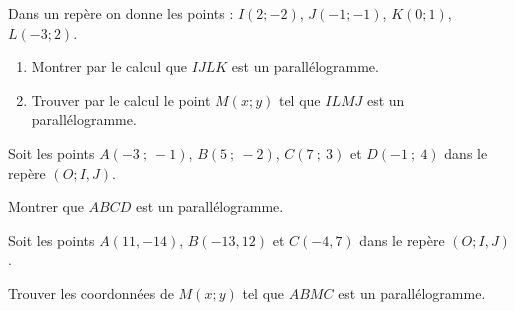 \begin{example}\hfill
	
	Dans un repère on donne les points : $I(2 ; -2)$, $J(-1 ; -1)$, $K(0 ; 1)$, $L(-3 ; 2)$. 
	\begin{enumerate}[leftmargin=*,label=\alph*)] 
		\item Montrer par le calcul que $IJLK$ est un parallélogramme.
		\vfill 
		\item Trouver par le calcul le point $M(x;y)$ tel que $ILMJ$ est un parallélogramme.
		\vfill 
	\end{enumerate} 
\end{example}

\begin{exercise} \label{chapter06:exercices:parallelogrammes01}
	Soit les points $A(-3~;~-1)$, $B(5~;~-2)$, $C(7~;~3)$ et $D(-1~;~4)$ dans le repère $(O;I,J)$. 
	
	Montrer que  $ABCD$  est un parallélogramme.
\end{exercise}

\begin{exercise} \label{chapter06:exercices:parallelogrammes02}
	Soit les points $A(11,-14)$, $B(-13,12)$ et $C(-4,7)$ dans le repère $(O;I,J)$.
	
	Trouver les coordonnées de $M(x;y)$ tel que $ABMC$ est un parallélogramme.
\end{exercise}
%	 


